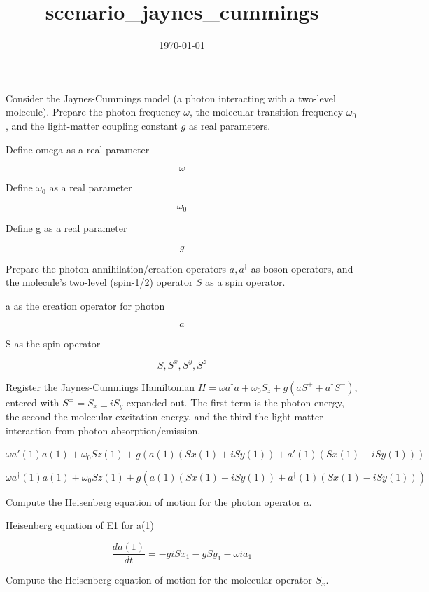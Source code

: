 \documentclass[dvipdfmx]{article}
\title{scenario\_jaynes\_cummings}
\date{\today}
\begin{document}
\maketitle

Consider the Jaynes-Cummings model (a photon interacting with a two-level molecule). Prepare the photon frequency $\omega$, the molecular transition frequency $\omega_0$, and the light-matter coupling constant $g$ as real parameters.

Define omega as a real parameter

\[
  \omega
\]

Define $\omega_0$ as a real parameter

\[
  \omega_{0}
\]

Define g as a real parameter

\[
  g
\]

Prepare the photon annihilation/creation operators $a,a^\dagger$ as boson operators, and the molecule's two-level (spin-1/2) operator $S$ as a spin operator.

a as the creation operator for photon

\[
  a
\]

S as the spin operator

\[
  S, S^{x}, S^{y}, S^{z}
\]

Register the Jaynes-Cummings Hamiltonian $H=\omega a^\dagger a+\omega_0S_z+g(aS^++a^\dagger S^-)$, entered with $S^\pm=S_x\pm iS_y$ expanded out. The first term is the photon energy, the second the molecular excitation energy, and the third the light-matter interaction from photon absorption/emission.

$\omega a'(1) a(1) + \omega_0 Sz(1) + g (a(1) (Sx(1) + i Sy(1)) + a'(1) (Sx(1) - i Sy(1)))$

\begin{equation}
  \omega a^{\dagger}(1) a(1) + \omega_0 Sz(1) + g (a(1) (Sx(1) + i Sy(1)) + a^{\dagger}(1) (Sx(1) - i Sy(1)))
  \label{eq:E1}
\end{equation}

Compute the Heisenberg equation of motion for the photon operator $a$.

Heisenberg equation of E1 for a(1)

\begin{equation}
  \frac{d a(1)}{d t} = - g \mathit{i} Sx_1 - g Sy_1 - \omega \mathit{i} {a}_{1}
  \label{eq:E2}
\end{equation}

Compute the Heisenberg equation of motion for the molecular operator $S_x$.
\end{document}
